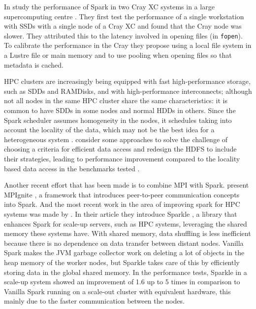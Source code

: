 \documentclass{article}
\begin{document}
In \citeyear{Chaimov2016} \citeauthor{Chaimov2016} study the performance of Spark in two Cray XC systems in a large supercomputing centre \cite{Chaimov2016}. They first test the performance of a single workstation with SSDs with a single node of a Cray XC and found that the Cray node was slower. They attributed this to the latency involved in opening files (in \texttt{fopen}). To calibrate the performance in the Cray they propose using a local file system in a Lustre file or main memory and to use pooling when opening files so that metadata is cached.

HPC clusters are increasingly being equipped with fast high-performance storage, such as SDDs and RAMDisks, and with high-performance interconnects; although not all nodes in the same HPC cluster share the same characteristics: it is common to have SDDs in some nodes and normal HDDs in others. Since the Spark scheduler assumes homogeneity in the nodes, it schedules taking into account the locality of the data, which may not be the best idea for a heterogeneous system \cite{Islam2016}. \citeauthor{Islam2016} consider some approaches to solve the challenge of choosing a criteria for efficient data access and redesign the HDFS to include their strategies, leading to performance improvement compared to the locality based data access in the benchmarks tested \cite{Islam2016}.

Another recent effort that has been made is to combine MPI with Spark. \citeauthor{Morris2017} present MPIgnite \cite{Morris2017}, a framework that introduces peer-to-peer communication concepts into Spark. And the most recent work in the area of improving spark for HPC systems was made by \citeauthor{kim2017sparkle}. In their article they introduce Sparkle \cite{kim2017sparkle}, a library that enhances Spark for scale-up servers, such as HPC systems, leveraging the shared memory these systems have. With shared memory, data shuffling is less inefficient because there is no dependence on data transfer between distant nodes. Vanilla Spark makes the JVM garbage collector work on deleting a lot of objects in the heap memory of the worker nodes, but Sparkle takes care of this by efficiently storing data in the global shared memory. In the performance tests, Sparkle in a scale-up system showed an improvement of 1.6 up to 5 times in comparison to Vanilla Spark running on a scale-out cluster with equivalent hardware, this mainly due to the faster communication between the nodes.
\end{document}
